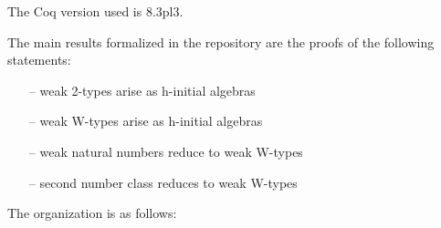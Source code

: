 \documentclass{article}
\theoremstyle{remark}
\theoremstyle{definition}
\begin{document}
\medskip

\noindent
The Coq version used is 8.3pl3.

\medskip

\noindent
The main results formalized in the repository are the proofs of the following
statements:
\begin{itemize}
\item[--]  weak 2-types arise as h-initial algebras
\item[--] weak W-types arise as h-initial algebras
\item[--] weak natural numbers reduce to weak W-types
\item[--] second number class reduces to weak W-types
  \end{itemize}
  
  \medskip
  
 \noindent 
The organization is as follows:
\end{document}
